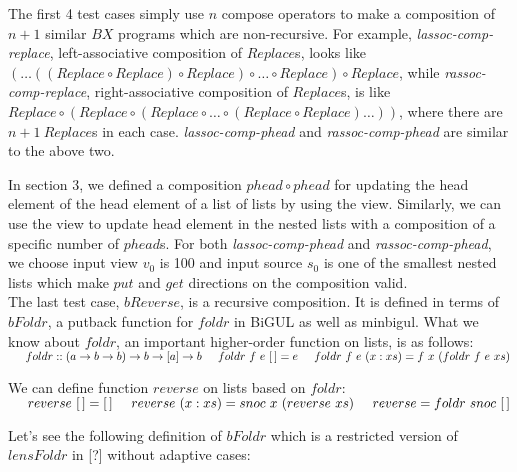 \documentclass[runningheads]{llncs}
\newcommand{\tab}{\hspace*{5mm}}
\begin{document}
The first 4 test cases simply use $n$ compose operators to make a composition of $n + 1$ similar $BX$ programs which are non-recursive. For example, \textit{lassoc-comp-replace}, left-associative composition of $Replace$s, looks like $(\ldots((Replace \circ Replace) \circ Replace) \circ \ldots \circ Replace) \circ Replace$, while \textit{rassoc-comp-replace}, right-associative composition of $Replace$s, is like $Replace \circ (Replace \circ (Replace \circ \ldots \circ (Replace \circ Replace)\ldots))$, where there are $n + 1 \ Replace$s in each case. \textit{lassoc-comp-phead} and \textit{rassoc-comp-phead} are similar to the above two.

In section 3, we defined a composition $phead \circ phead$ for updating the head element of the head element of a list of lists by using the view. Similarly, we can use the view to update head element in the nested lists with a composition of a specific number of $phead$s. For both \textit{lassoc-comp-phead} and \textit{rassoc-comp-phead}, we choose input view $v_0$ is 100 and input source $s_0$ is one of the smallest nested lists which make $put$ and $get$ directions on the composition valid.\\

The last test case, $bReverse$, is a recursive composition. It is defined in terms of $bFoldr$, a putback function for $foldr$ in BiGUL as well as minbigul. What we know about $foldr$, an important higher-order function on lists, is as follows:\\
    $\tab foldr :: (a \to b \to b) \to b \to [a] \to b\\
    \tab foldr \ f \ e \ [\,] = e\\
    \tab foldr \ f \ e \ (x:xs) = f \ x \ (foldr \ f \ e \ xs)$

We can define function $reverse$ on lists based on $foldr$:\\
    $\tab reverse \ [\,] = [\,]\\
    \tab reverse \ (x:xs) = snoc \ x \ (reverse \ xs)\\
    \tab reverse = foldr \ snoc \ [\,]$

Let's see the following definition of $bFoldr$ which is a restricted version of $lensFoldr$ in [?] without adaptive cases:
\end{document}
